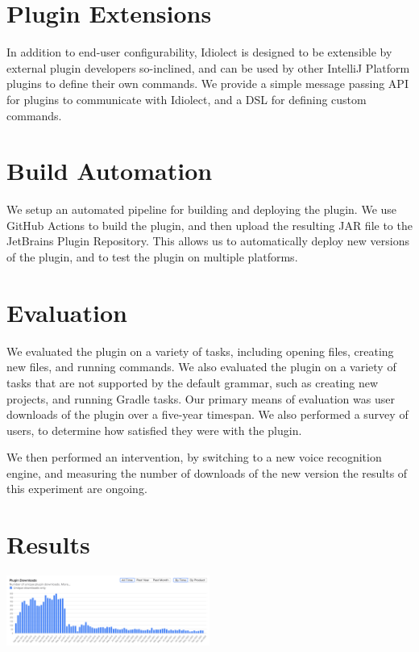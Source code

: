 \documentclass[conference]{IEEEtran}
\begin{document}
\section{Plugin Extensions}

In addition to end-user configurability, Idiolect is designed to be extensible by external plugin developers so-inclined, and can be used by other IntelliJ Platform plugins to define their own commands. We provide a simple message passing API for plugins to communicate with Idiolect, and a DSL for defining custom commands.

\section{Build Automation}

We setup an automated pipeline for building and deploying the plugin. We use GitHub Actions to build the plugin, and then upload the resulting JAR file to the JetBrains Plugin Repository. This allows us to automatically deploy new versions of the plugin, and to test the plugin on multiple platforms.

\section{Evaluation}

We evaluated the plugin on a variety of tasks, including opening files, creating new files, and running commands. We also evaluated the plugin on a variety of tasks that are not supported by the default grammar, such as creating new projects, and running Gradle tasks. Our primary means of evaluation was user downloads of the plugin over a five-year timespan. We also performed a survey of users, to determine how satisfied they were with the plugin.

We then performed an intervention, by switching to a new voice recognition engine, and measuring the number of downloads of the new version the results of this experiment are ongoing.

\section{Results}

\includegraphics[width=0.50\textwidth]{downloads.png}
\end{document}
